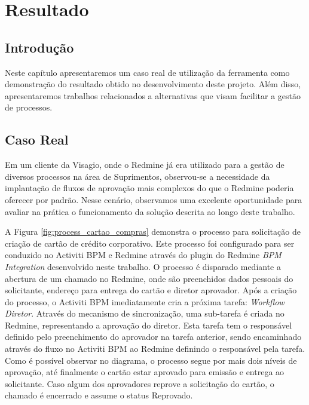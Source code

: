 \chapter{Resultado}\label{chp:resultado}

\section{Introdução}\label{sec:resultado-introducao}
Neste capítulo apresentaremos um caso real de utilização da ferramenta como demonstração do resultado obtido no desenvolvimento deste projeto. Além disso, apresentaremos trabalhos relacionados a alternativas que visam facilitar a gestão de processos.

\section{Caso Real}\label{sec:resultado-caso_real}

Em um cliente da Visagio, onde o Redmine já era utilizado para a gestão de diversos processos na área de Suprimentos, observou-se a necessidade da implantação de fluxos de aprovação mais complexos do que o Redmine poderia oferecer por padrão. Nesse cenário, observamos uma excelente oportunidade para avaliar na prática o funcionamento da solução descrita ao longo deste trabalho.

A Figura \ref{fig:process_cartao_compras} demonstra o processo para solicitação de criação de cartão de crédito corporativo. Este processo foi configurado para ser conduzido no Activiti BPM e Redmine através do plugin do Redmine \textit{BPM Integration} desenvolvido neste trabalho. O processo é disparado mediante a abertura de um chamado no Redmine, onde são preenchidos dados pessoais do solicitante, endereço para entrega do cartão e diretor aprovador. Após a criação do processo, o Activiti BPM imediatamente cria a próxima tarefa: \textit{Workflow Diretor}. Através do mecanismo de sincronização, uma sub-tarefa é criada no Redmine, representando a aprovação do diretor. Esta tarefa tem o responsável definido pelo preenchimento do aprovador na tarefa anterior, sendo encaminhado através do fluxo no Activiti BPM ao Redmine definindo o responsável pela tarefa. Como é possível observar no diagrama, o processo segue por mais dois níveis de aprovação, até finalmente o cartão estar aprovado para emissão e entrega ao solicitante. Caso algum dos aprovadores reprove a solicitação do cartão, o chamado é encerrado e assume o status Reprovado.

